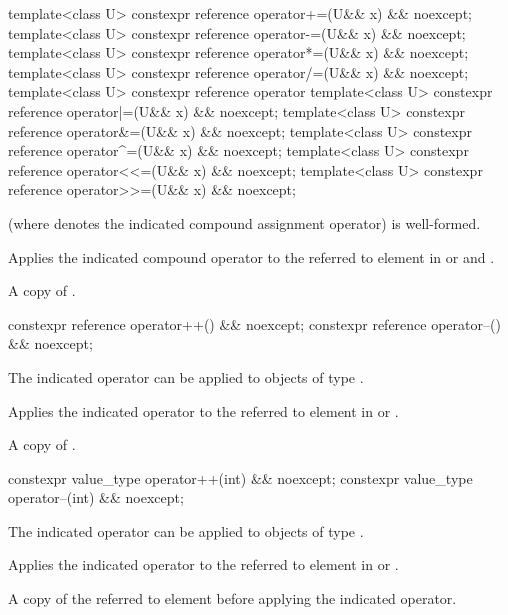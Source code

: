 \begin{itemdecl}
template<class U> constexpr reference operator+=(U&& x) && noexcept;
template<class U> constexpr reference operator-=(U&& x) && noexcept;
template<class U> constexpr reference operator*=(U&& x) && noexcept;
template<class U> constexpr reference operator/=(U&& x) && noexcept;
template<class U> constexpr reference operator%
template<class U> constexpr reference operator|=(U&& x) && noexcept;
template<class U> constexpr reference operator&=(U&& x) && noexcept;
template<class U> constexpr reference operator^=(U&& x) && noexcept;
template<class U> constexpr reference operator<<=(U&& x) && noexcept;
template<class U> constexpr reference operator>>=(U&& x) && noexcept;
\end{itemdecl}

\begin{itemdescr}
  \pnum\constraints
   (where  denotes the indicated compound assignment operator) is well-formed.

  \pnum\effects
  Applies the indicated compound operator to the referred to element in  or  and .

  \pnum\returns
  A copy of .
\end{itemdescr}

\begin{itemdecl}
constexpr reference operator++() && noexcept;
constexpr reference operator--() && noexcept;
\end{itemdecl}

\begin{itemdescr}
  \pnum\constraints
  The indicated operator can be applied to objects of type .

  \pnum\effects
  Applies the indicated operator to the referred to element in  or .

  \pnum\returns
  A copy of .
\end{itemdescr}

\begin{itemdecl}
constexpr value_type operator++(int) && noexcept;
constexpr value_type operator--(int) && noexcept;
\end{itemdecl}

\begin{itemdescr}
  \pnum\remarks
  The indicated operator can be applied to objects of type .

  \pnum\effects
  Applies the indicated operator to the referred to element in  or .

  \pnum\returns
  A copy of the referred to element before applying the indicated operator.
\end{itemdescr}

